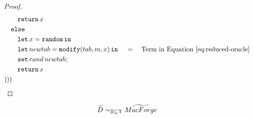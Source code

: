 \begin{proof}
{\begin{align*}
\begin{aligned}
            &\quad\quad \mathtt{return}\, x \\
            &\quad \mathtt{else} \\
            &\quad\quad \mathtt{let}\,x=\mathtt{random}\,\mathtt{in}\, \\
            &\quad\quad \mathtt{let}\,newtab=\mathtt{modify}(tab, m, x)\,\mathtt{in}\, \\
            &\quad\quad \mathtt{set}\,rand\,newtab; \\
            &\quad\quad \mathtt{return}\, x \\
            &)))
        \end{aligned}
        \quad=\quad
        {\text{Term in Equation~\ref{eq:reduced-oracle}}}
    \end{align*}
}
\end{proof}

\begin{theorem}\label{theorem:tildeD-sim-tildeMACForge}
\[ \widetilde{D} \sim_{\Xi\subseteq\Upsilon} \widetilde{MacForge} \]
\end{theorem}

